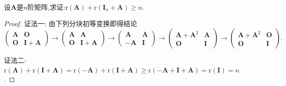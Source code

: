 \documentclass[../../main.tex]{subfiles}%
\begin{document}
\begin{example}
设\(\boldsymbol{A}\)是\(n\)阶矩阵,求证:\(\mathrm{r}(\boldsymbol{A})+\mathrm{r}(\boldsymbol{I}_n+\boldsymbol{A})\geqslant  n\).
\end{example}
\begin{proof}

{\color{blue}证法一:}
由下列分块初等变换即得结论
\[
\begin{pmatrix}
\boldsymbol{A}&\boldsymbol{O}\\
\boldsymbol{O}&\boldsymbol{I}+\boldsymbol{A}
\end{pmatrix}\to
\begin{pmatrix}
\boldsymbol{A}&\boldsymbol{A}\\
\boldsymbol{O}&\boldsymbol{I}+\boldsymbol{A}
\end{pmatrix}\to
\begin{pmatrix}
\boldsymbol{A}&\boldsymbol{A}\\
-\boldsymbol{A}&\boldsymbol{I}
\end{pmatrix}\to
\begin{pmatrix}
\boldsymbol{A}+\boldsymbol{A}^2&\boldsymbol{A}\\
\boldsymbol{O}&\boldsymbol{I}
\end{pmatrix}\to
\begin{pmatrix}
\boldsymbol{A}+\boldsymbol{A}^2&\boldsymbol{O}\\
\boldsymbol{O}&\boldsymbol{I}
\end{pmatrix}.
\]

{\color{blue}证法二:}
\(\mathrm{r}(\boldsymbol{A})+\mathrm{r}(\boldsymbol{I}+\boldsymbol{A})=\mathrm{r}(-\boldsymbol{A})+\mathrm{r}(\boldsymbol{I}+\boldsymbol{A})\geqslant \mathrm{r}(-\boldsymbol{A}+\boldsymbol{I}+\boldsymbol{A})=\mathrm{r}(\boldsymbol{I}) = n\).
\end{proof}
\end{document}
